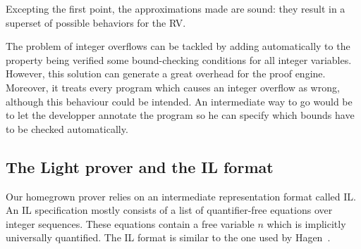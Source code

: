 Excepting the first point, the approximations made are sound: they result in a superset of possible behaviors for the RV. %

The problem of integer overflows can be tackled by adding automatically to the property being verified some bound-checking conditions for all integer variables. However, this solution can generate a great overhead for the proof engine. Moreover, it treats every program which causes an integer overflow as wrong, although this behaviour could be intended. An intermediate way to go would be to let the developper annotate the program so he can specify which bounds have to be checked automatically.

%




\subsection{The Light prover and the IL format} 

Our homegrown prover relies on an intermediate representation format called
{IL}. An IL specification mostly consists of a list of quantifier-free equations
over integer sequences. These equations contain a free variable $n$ which is
implicitly universally quantified. The IL format is similar to the one used by Hagen~\cite{HagenPhD}.



